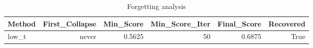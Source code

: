 \begin{table}[htbp]
\centering
\caption{Forgetting analysis}
\label{tab:forgetting}
\begin{tabular}{lrrrrr}
\toprule
\textbf{Method} & \textbf{First\_Collapse} & \textbf{Min\_Score} & \textbf{Min\_Score\_Iter} & \textbf{Final\_Score} & \textbf{Recovered} \\
\midrule
low\_t & never & 0.5625 & 50 & 0.6875 & True \\
\bottomrule
\end{tabular}
\end{table}